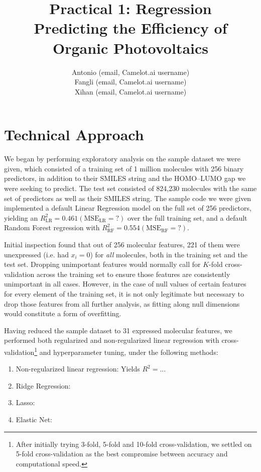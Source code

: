 \documentclass[11pt]{article}
\title{Practical 1: Regression \\ Predicting the Efficiency of Organic Photovoltaics}
\author{Antonio (email, Camelot.ai username) \\
	Fangli (email, Camelot.ai username) \\
	Xihan (email, Camelot.ai username)}
\begin{document}
\maketitle{}



\section{Technical Approach}

We began by performing exploratory analysis on the sample dataset we were given, which consisted of a training set of 1 million molecules with 256 binary predictors, in addition to their SMILES string and the HOMO--LUMO gap we were seeking to predict. The test set consisted of 824,230 molecules with the same set of predictors as well as their SMILES string. The sample code we were given implemented a default Linear Regression model on the full set of 256 predictors, yielding an $R_\textrm{LR}^2 = 0.461 (\textrm{MSE}_\textrm{LR} = ?)$ over the full training set, and a default Random Forest regression with $R_\textrm{RF}^2 = 0.554 (\textrm{MSE}_\textrm{RF} = ?)$.

Initial inspection found that out of 256 molecular features, 221 of them were unexpressed (i.e. had $x_i = 0$) for \emph{all} molecules, both in the training set and the test set. Dropping unimportant features would normally call for $K$-fold cross-validation across the training set to ensure those features are consistently unimportant in all cases. However, in the case of null values of certain features for every element of the training set, it is not only legitimate but necessary to drop those features from all further analysis, as fitting along null dimensions would constitute a form of overfitting.

Having reduced the sample dataset to 31 expressed molecular features, we performed both regularized and non-regularized linear regression with cross-validation\footnote{After initially trying 3-fold, 5-fold and 10-fold cross-validation, we settled on 5-fold cross-validation as the best compromise between accuracy and computational speed.} and hyperparameter tuning, under the following methods:

\begin{enumerate}

\item Non-regularized linear regression: Yields $R^2 =  ...$
\item Ridge Regression: 
\item Lasso:
\item Elastic Net:

\end{enumerate}
\end{document}
